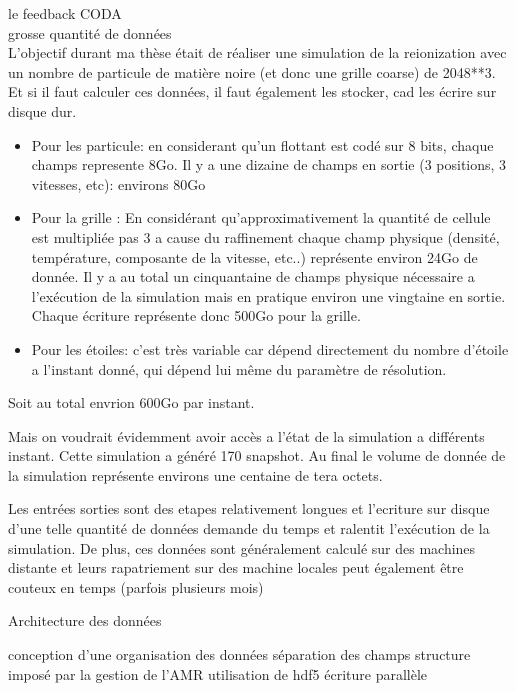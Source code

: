le feedback CODA\\
grosse quantité de données\\

L'objectif durant ma thèse était de réaliser une simulation de la reionization avec un nombre de particule de matière noire (et donc une grille coarse) de 2048**3.
Et si il faut calculer ces données, il faut également les stocker, cad les écrire sur disque dur.

\begin{itemize}

\item Pour les particule:
en considerant qu'un flottant est codé sur 8 bits, chaque champs represente 8Go.
Il y a une dizaine de champs en sortie (3 positions, 3 vitesses, etc): environs 80Go

\item Pour la grille :
En considérant qu'approximativement la quantité de cellule est multipliée pas 3 a cause du raffinement  chaque champ physique (densité, température, composante de la vitesse, etc..) représente environ 24Go de donnée.
Il y a au total un cinquantaine de champs physique nécessaire a l'exécution de la simulation mais en pratique environ une vingtaine en sortie.
Chaque écriture représente donc 500Go pour la grille.

\item Pour les étoiles:
c'est très variable car dépend directement du nombre d'étoile a l'instant donné, qui dépend lui même du paramètre de résolution.

\end{itemize}

Soit au total envrion 600Go par instant.

Mais on voudrait évidemment avoir accès a l'état de la simulation a différents instant.
Cette simulation a généré 170 snapshot.
Au final le volume de donnée de la simulation représente environs une centaine de tera octets.

Les entrées sorties sont des etapes relativement longues et l'ecriture sur disque d'une telle quantité de données demande du temps et ralentit l'exécution de la simulation.
De plus, ces données sont généralement calculé sur des machines distante et leurs rapatriement sur des machine locales peut également être couteux en temps (parfois plusieurs mois)

Architecture des données 

conception d'une organisation des données
séparation des champs
structure imposé par la gestion de l'AMR
utilisation de hdf5
écriture parallèle

%
